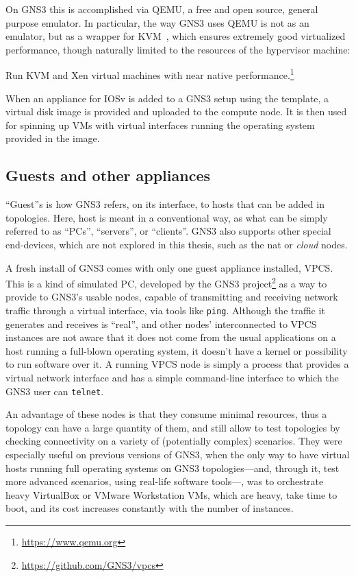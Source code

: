On GNS3 this is accomplished via QEMU, a free and open source, general purpose emulator.
In particular, the way GNS3 uses QEMU is not as an emulator, but as a wrapper for KVM~\cite{whatiskvm}, which ensures extremely good virtualized performance, though naturally limited to the resources of the hypervisor machine:
\begin{displayquote}
Run KVM and Xen virtual machines with near native performance.\footnote{\url{https://www.qemu.org}}
\end{displayquote}

When an appliance for IOSv is added to a GNS3 setup using the template, a virtual disk image is provided and uploaded to the compute node.
It is then used for spinning up VMs with virtual interfaces running the operating system provided in the image. %

\subsection{Guests and other appliances}
\label{subsec:gns3guestsappliances}

``Guest''s is how GNS3 refers, on its interface, to hosts that can be added in topologies.
Here, host is meant in a conventional way, as what can be simply referred to as ``PCs'', ``servers'', or ``clients''.
GNS3 also supports other special end-devices, which are not explored in this thesis, such as the \acrshort{nat} or \emph{cloud} nodes.

A fresh install of GNS3 comes with only one guest appliance installed, VPCS.
This is a kind of simulated PC, developed by the GNS3 project\footnote{\url{https://github.com/GNS3/vpcs}} as a way to provide to GNS3's usable nodes, capable of transmitting and receiving network traffic through a virtual interface, via tools like \texttt{ping}.
Although the traffic it generates and receives is ``real'', and other nodes' interconnected to VPCS instances are not aware that it does not come from the usual applications on a host running a full-blown operating system, it doesn't have a kernel or possibility to run software over it.
A running VPCS node is simply a process that provides a virtual network interface and has a simple command-line interface to which the GNS3 user can \texttt{telnet}.

An advantage of these nodes is that they consume minimal resources, thus a topology can have a large quantity of them, and still allow to test topologies by checking connectivity on a variety of (potentially complex) scenarios.
They were especially useful on previous versions of GNS3, when the only way to have virtual hosts running full operating systems on GNS3 topologies---and, through it, test more advanced scenarios, using real-life software tools---, was to orchestrate heavy VirtualBox or VMware Workstation VMs, which are heavy, take time to boot, and its cost increases constantly with the number of instances.

